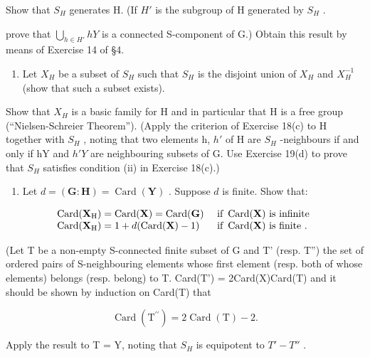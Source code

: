 Show that \(S_{H}\) generates H. (If \(H'\) is the subgroup of H generated by \(S_{H}\) .

prove that \(\bigcup_{h\in H'}hY\) is a connected S-component of G.) Obtain this result by means of Exercise 14 of §4.

\begin{enumerate}
\def\labelenumi{(\alph{enumi})}
\setcounter{enumi}{3}
\tightlist
\item
  Let \(X_{H}\) be a subset of \(S_{H}\) such that \(S_{H}\) is the disjoint union of \(X_{H}\) and \(X_{H}^{-1}\) (show that such a subset exists).
\end{enumerate}

Show that \(X_{H}\) is a basic family for H and in particular that H is a free group (``Nielsen-Schreier Theorem''). (Apply the criterion of Exercise 18(c) to H together with \(S_{H}\) , noting that two elements h, \(h'\) of H are \(S_{H}\) -neighbours if and only if hY and \(h'Y\) are neighbouring subsets of G. Use Exercise 19(d) to prove that \(S_{H}\) satisfies condition (ii) in Exercise 18(c).)

\begin{enumerate}
\def\labelenumi{(\alph{enumi})}
\setcounter{enumi}{4}
\tightlist
\item
  Let \(d = (\mathbf{G}:\mathbf{H}) = \operatorname{Card}(\mathbf{Y})\) . Suppose \(d\) is finite. Show that:
\end{enumerate}

\[
\begin{array}{l l} \operatorname{Card} (\mathbf {X} _ {\mathrm{H}}) = \operatorname{Card} (\mathbf {X}) = \operatorname{Card} (\mathbf {G}) & \text { if } \operatorname{Card} (\mathbf {X}) \text { is   infinite } \\ \operatorname{Card} (\mathbf {X} _ {\mathrm{H}}) = 1 + d (\operatorname{Card} (\mathbf {X}) - 1) & \text { if } \operatorname{Card} (\mathbf {X}) \text { is   finite }. \end{array}
\]

(Let T be a non-empty S-connected finite subset of G and T' (resp. T'') the set of ordered pairs of S-neighbouring elements whose first element (resp. both of whose elements) belongs (resp. belong) to T. Card(T') = 2Card(X)Card(T) and it should be shown by induction on Card(T) that

\[
\operatorname{Card} \left(\mathrm{T} ^ {\prime \prime}\right) = 2 \operatorname{Card} (\mathrm{T}) - 2.
\]

Apply the result to T = Y, noting that \(S_{H}\) is equipotent to \(T' - T''\) .

